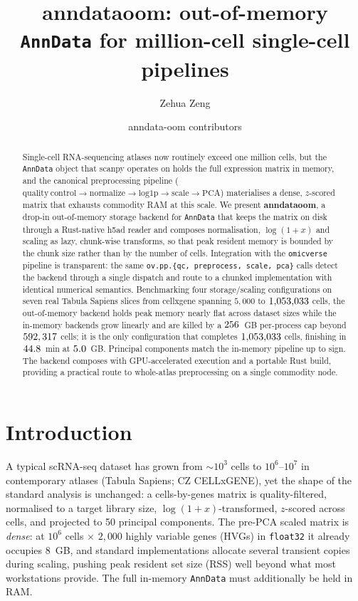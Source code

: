 \documentclass[11pt]{article}
\title{\textbf{\large anndataoom: out-of-memory \texttt{AnnData} for
million-cell single-cell pipelines}}
\author[1,2]{Zehua Zeng}
\author[1]{anndata-oom contributors}
\affil[1]{OmicVerse Project}
\affil[2]{\normalfont\texttt{starlitnightly@163.com}\ \textbar\
\texttt{https://github.com/omicverse/anndata-oom}}
\date{}
\begin{document}
\maketitle

\begin{abstract}
\noindent
Single-cell RNA-sequencing atlases now routinely exceed one million cells,
but the \texttt{AnnData} object\cite{virshup2024anndata} that scanpy
operates on\cite{wolf2018scanpy} holds the full expression matrix in memory,
and the canonical preprocessing pipeline ($\mathrm{quality\ control}
\rightarrow \mathrm{normalize} \rightarrow \mathrm{log1p} \rightarrow
\mathrm{scale} \rightarrow \mathrm{PCA}$) materialises a dense, $z$-scored
matrix that exhausts commodity RAM at this scale. We present
\textbf{anndataoom}, a drop-in out-of-memory storage backend for
\texttt{AnnData} that keeps the matrix on disk through a Rust-native h5ad
reader and composes normalisation, $\log(1{+}x)$ and scaling as lazy,
chunk-wise transforms, so that peak resident memory is bounded by the chunk
size rather than by the number of cells. Integration with the
\texttt{omicverse} pipeline\cite{omicverse} is transparent: the same
\texttt{ov.pp.\{qc, preprocess, scale, pca\}} calls detect the backend through
a single dispatch and route to a chunked implementation with identical
numerical semantics. Benchmarking four storage/scaling configurations on
seven real Tabula Sapiens slices\cite{tabulasapiens2022} from
cellxgene\cite{megill2021cellxgene} spanning $5{,}000$ to $1{,}053{,}033$ cells,
the out-of-memory backend holds peak memory nearly flat across dataset sizes
while the in-memory backends grow linearly and are killed by a
$256$~GB per-process cap beyond $592,317$ cells; it is the only
configuration that completes $1{,}053{,}033$ cells, finishing in
$44.8$~min at $5.0$~GB. Principal components match the
in-memory pipeline up to sign. The backend composes with GPU-accelerated
execution and a portable Rust build, providing a practical route to
whole-atlas preprocessing on a single commodity node.
\end{abstract}

\section{Introduction}

A typical scRNA-seq dataset has grown from $\sim$$10^3$ cells to
$10^6$--$10^7$ in contemporary atlases (Tabula
Sapiens\cite{tabulasapiens2022}; CZ CELLxGENE\cite{megill2021cellxgene}),
yet the shape of the standard analysis is unchanged: a cells-by-genes matrix
is quality-filtered, normalised to a target library size,
$\log(1{+}x)$-transformed, $z$-scored across cells, and projected to 50
principal components. The pre-PCA scaled matrix is \emph{dense}: at $10^6$
cells $\times$ $2{,}000$ highly variable genes (HVGs) in \texttt{float32} it
already occupies $8$~GB, and standard implementations allocate several
transient copies during scaling, pushing peak resident set size (RSS) well
beyond what most workstations provide. The full in-memory \texttt{AnnData}
must additionally be held in RAM.
\end{document}
